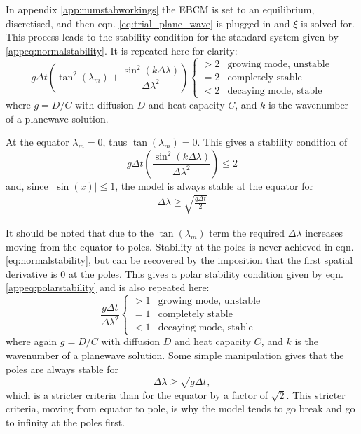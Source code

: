 \documentclass[12pt, onecolumn]{revtex4-2}    %
\begin{document}
In appendix \ref{app:numstabworkings} the EBCM is set to an equilibrium, discretised, and then eqn. \eqref{eq:trial_plane_wave} is plugged in and $\xi$ is solved for.
This process leads to the stability condition for the standard system given by \eqref{appeq:normalstability}.
It is repeated here for clarity:
\begin{equation}\label{eq:normalstability}
    g\Delta t\left(\tan^2(\lambda_m) + \frac{\sin^2(k\Delta\lambda)}{\Delta\lambda^2}\right)
    \begin{cases}
        > 2 & \text{growing mode, unstable} \\
        = 2 & \text{completely stable}      \\
        < 2 & \text{decaying mode, stable}
    \end{cases}
\end{equation}
where $g = D / C$ with diffusion $D$ and heat capacity $C$, and $k$ is the wavenumber of a planewave solution.

At the equator $\lambda_m = 0$, thus $\tan(\lambda_m) = 0$.
This gives a stability condition of
\begin{equation}
    g\Delta t\left(\frac{\sin^2(k\Delta\lambda)}{\Delta\lambda^2}\right) \le 2
\end{equation}
and, since $|\sin(x)| \le 1$, the model is always stable at the equator for
\begin{align*}
    \Delta\lambda \ge \sqrt{\frac{g\Delta t}{2}}
\end{align*}

It should be noted that due to the $\tan(\lambda_m)$ term the required $\Delta\lambda$ increases moving from the equator to poles.
Stability at the poles is never achieved in eqn. \eqref{eq:normalstability}, but can be recovered by the imposition that the first spatial derivative is $0$ at the poles.
This gives a polar stability condition given by eqn. \eqref{appeq:polarstability} and is also repeated here:
\begin{equation} \label{eq:polarstability}
    \frac{g\Delta t}{\Delta \lambda ^2}
    \begin{cases}
        > 1 & \text{growing mode, unstable} \\
        = 1 & \text{completely stable}      \\
        < 1 & \text{decaying mode, stable}
    \end{cases}
\end{equation}
where again $g = D / C$ with diffusion $D$ and heat capacity $C$, and $k$ is the wavenumber of a planewave solution.
Some simple manipulation gives that the poles are always stable for
\begin{equation}
    \Delta\lambda \ge \sqrt{g\Delta t},
\end{equation}
which is a stricter criteria than for the equator by a factor of $\sqrt{2}$.
This stricter criteria, moving from equator to pole, is why the model tends to go break and go to infinity at the poles first.
\end{document}
